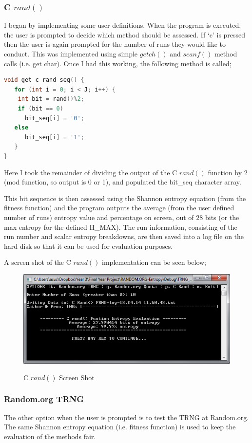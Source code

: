 \documentclass[a4paper,10.5pt]{article}
\begin{document}
\subsubsection{C $rand()$}
I began by implementing some user definitions. When the program is executed, the user is prompted to decide which method should be assessed. If `c' is pressed then the user is again prompted for the number of runs they would like to conduct. This was implemented using simple $getch()$ and $scanf()$ method calls (i.e. get char). Once I had this working, the following method is called;

\begin{lstlisting}[language=C]
void get_c_rand_seq() {
   for (int i = 0; i < J; i++) {
    int bit = rand()%2;
    if (bit == 0)
      bit_seq[i] = '0';
   else 
      bit_seq[i] = '1';
   }
}
\end{lstlisting}

Here I took the remainder of dividing the output of the C $rand()$ function by 2 (mod function, so output is 0 or 1), and populated the bit\_seq character array.

This bit sequence is then assessed using the Shannon entropy equation (from the fitness function) and the program outputs the average (from the user defined number of runs) entropy value and percentage on screen, out of 28 bits (or the max entropy for the defined H\_MAX). The run information, consisting of the run number and scalar entropy breakdowns, are then saved into a log file on the hard disk so that it can be used for evaluation purposes.

A screen shot of the C $rand()$ implementation can be seen below;

\begin{figure}[H]
\centering
\caption{C $rand()$ Screen Shot}
\includegraphics[scale = 0.75]{c-ss.png}
\label{sngpss}
\end{figure}


\subsubsection{Random.org TRNG}
The other option when the user is prompted is to test the TRNG at Random.org. The same Shannon entropy equation (i.e. fitness function) is used to keep the evaluation of the methods fair. 
\end{document}
